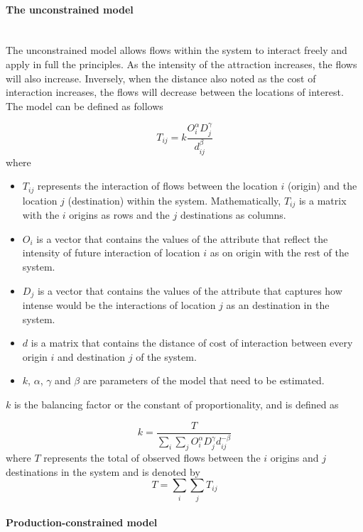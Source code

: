 \documentclass{article}
\begin{document}
\paragraph{The unconstrained model}\mbox{}\\

The unconstrained model allows flows within the system to interact freely and apply in full the principles. As the intensity of the attraction increases, the flows will also increase. Inversely, when the distance also noted as the cost of interaction increases, the flows will decrease between the locations of interest. The model can be defined as follows \citep{arcauteSpatialInteractionModelling2023}

\[T_{ij} = k \frac{O_i^\alpha  D_j^\gamma}{ d_{ij}^\beta}\] where 

\begin{itemize}
  \item $T_{ij}$ represents the interaction of flows between the location $i$ (origin) and the location $j$ (destination) within the system. Mathematically,  $T_{ij}$ is a matrix with the $i$ origins as rows and the $j$ destinations as columns.
  \item $O_{i}$ is a vector that contains the values of the attribute that reflect the intensity of future interaction of location $i$ as on origin with the rest of the system.
  \item $D_{j}$ is a vector that contains the values of the attribute that captures how intense would be the interactions of location $j$ as an destination in the system.
    \item $d$ is a matrix that contains the distance of cost of interaction between every origin $i$ and destination $j$ of the system.
    \item $k$, $\alpha$, $\gamma$ and $\beta$ are parameters of the model that need to be estimated.
\end{itemize}

$k$ is the balancing factor or the constant of proportionality, and is defined as

\[k = \frac{T}{\sum_i \sum_j O_i^\alpha  D_j^\gamma  d_{ij}^{-\beta}}\] where $T$ represents the total of observed flows between the $i$ origins and $j$ destinations in the system and is denoted by \[T= \sum_i \sum_j T_{ij}\]
\paragraph{Production-constrained model}\mbox{}\\
\end{document}

